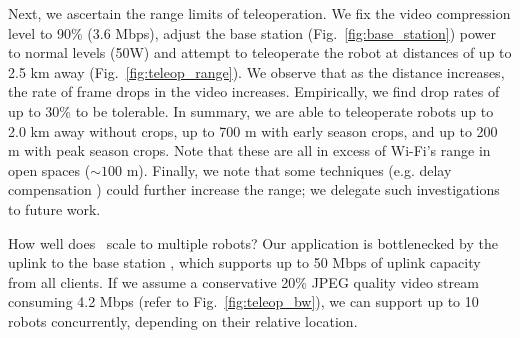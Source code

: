  Next, we ascertain the range limits of teleoperation. We fix the video compression level to 90\% (3.6 Mbps), adjust the base station (Fig.~\ref{fig:base_station}) power to normal levels (50W) and attempt to teleoperate the robot at distances of up to 2.5 km away (Fig.~\ref{fig:teleop_range}). We observe that as the distance increases, the rate of frame drops in the video increases. Empirically, we find drop rates of up to 30\% to be tolerable. In summary, we are able to teleoperate robots up to 2.0 km away without crops, up to 700 m with early season crops, and up to 200 m with peak season crops. Note that these are all in excess of Wi-Fi's range in open spaces ($\sim 100$ m). Finally, we note that some techniques (e.g. delay compensation \cite{chakraborty_towards_2024}) could further increase the range; we delegate such investigations to future work.

 How well does \name\ scale to multiple robots? Our application is bottlenecked by the uplink to the base station \cite{celona_ap11}, which supports up to 50 Mbps of uplink capacity from all clients. If we assume a conservative 20\% JPEG quality video stream consuming 4.2 Mbps (refer to Fig.~\ref{fig:teleop_bw}), we can support up to 10 robots concurrently, depending on their relative location. %
